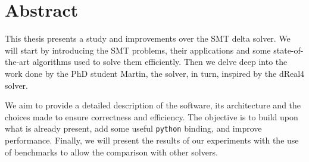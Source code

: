 \chapter*{Abstract}
This thesis presents a study and improvements over the \dlinearfour SMT delta solver.
We will start by introducing the SMT problems, their applications and some state-of-the-art algorithms used to solve them efficiently.
Then we delve deep into the work done by the PhD student Martin, the \dlinearfour solver, in turn, inspired by the dReal4 solver.

We aim to provide a detailed description of the software, its architecture and the choices made to ensure correctness and efficiency.
The objective is to build upon what is already present, add some useful \texttt{python} binding, and improve performance.
Finally, we will present the results of our experiments with the use of benchmarks to allow the comparison with other solvers.

